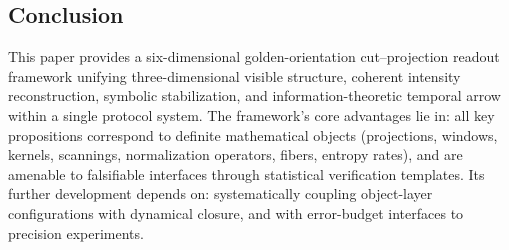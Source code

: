 \subsection{Conclusion}

This paper provides a six-dimensional golden-orientation cut--projection readout framework unifying three-dimensional visible structure, coherent intensity reconstruction, symbolic stabilization, and information-theoretic temporal arrow within a single protocol system. The framework's core advantages lie in: all key propositions correspond to definite mathematical objects (projections, windows, kernels, scannings, normalization operators, fibers, entropy rates), and are amenable to falsifiable interfaces through statistical verification templates. Its further development depends on: systematically coupling object-layer configurations with dynamical closure, and with error-budget interfaces to precision experiments.
